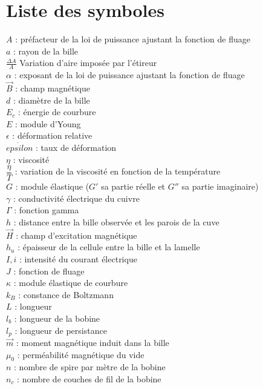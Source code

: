 \chapter*{Liste des symboles}

\noindent $A$ : préfacteur de la loi de puissance ajustant la fonction de fluage\\
$a$ : rayon de la bille\\
$\frac{\Delta A}{A}$ Variation d'aire imposée par l'étireur\\
$\alpha$ : exposant de la loi de puissance ajustant la fonction de fluage\\
$\vec{B}$ : champ magnétique\\
$d$ : diamètre de la bille\\
$E_c$ : énergie de courbure\\
$E$ : module d'Young\\
$\epsilon$ : déformation relative\\
$\dot{epsilon}$ : taux de déformation \\
$\eta$ : viscosité\\
$\dfrac{\eta}{T}$ : variation de la viscosité en fonction de la température\\
$G$ : module élastique ($G'$ sa partie réelle et $G''$ sa partie imaginaire)\\
$\gamma$ : conductivité électrique du cuivre\\
$\Gamma$ : fonction gamma \\
$h$ : distance entre la bille observée et les parois de la cuve\\
$\vec{H} $ : champ d'excitation magnétique \\
$h_u$ : épaisseur de la cellule entre la bille et la lamelle\\
$I,i$ : intensité du courant électrique\\
$J$ : fonction de fluage\\
$\kappa$ : module élastique de courbure\\
$k_B$ : constance de Boltzmann\\
$L$ : longueur\\
$l_b$ : longueur de la bobine\\
$l_p$ : longueur de persistance\\
$\vec{m}$ : moment magnétique induit dans la bille\\
$\mu_0$ : perméabilité magnétique du vide\\
$n$ : nombre de spire par mètre de la bobine\\
$n_c$ : nombre de couches de fil de la bobine\\
